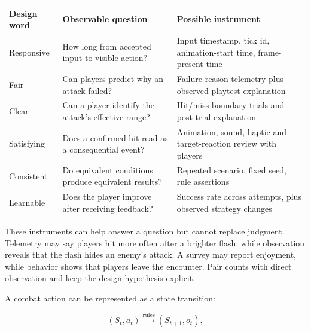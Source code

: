 {\def\LTcaptype{none} %
\begin{longtable}[]{@{}
  >{\raggedright\arraybackslash}p{}
  >{\raggedright\arraybackslash}p{}
  >{\raggedright\arraybackslash}p{}@{}}
\toprule\noalign{}
\begin{minipage}[b]{\linewidth}\raggedright
Design word
\end{minipage} & \begin{minipage}[b]{\linewidth}\raggedright
Observable question
\end{minipage} & \begin{minipage}[b]{\linewidth}\raggedright
Possible instrument
\end{minipage} \\
\midrule\noalign{}
\endhead
\bottomrule\noalign{}
\endlastfoot
Responsive & How long from accepted input to visible action? & Input timestamp, tick id, animation-start time, frame-present time \\
Fair & Can players predict why an attack failed? & Failure-reason telemetry plus observed playtest explanation \\
Clear & Can a player identify the attack's effective range? & Hit/miss boundary trials and post-trial explanation \\
Satisfying & Does a confirmed hit read as a consequential event? & Animation, sound, haptic and target-reaction review with players \\
Consistent & Do equivalent conditions produce equivalent results? & Repeated scenario, fixed seed, rule assertions \\
Learnable & Does the player improve after receiving feedback? & Success rate across attempts, plus observed strategy changes \\
\end{longtable}
}

These instruments can help answer a question but cannot replace judgment. Telemetry may say players hit more often after a brighter flash, while observation reveals that the flash hides an enemy's attack. A survey may report enjoyment, while behavior shows that players leave the encounter. Pair counts with direct observation and keep the design hypothesis explicit.

A combat action can be represented as a state transition:

\[
(S_t, a_t) \xrightarrow{\text{rules}} (S_{t+1}, o_t),
\]


